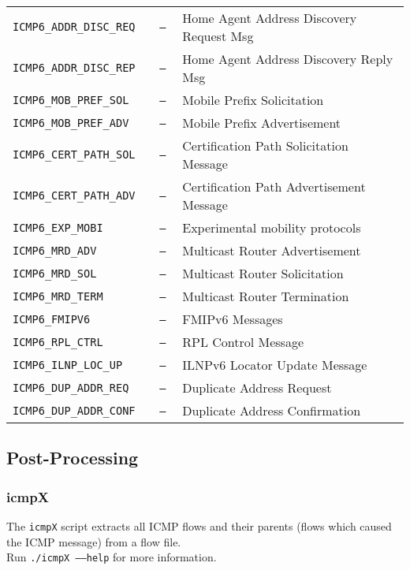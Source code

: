 \documentclass[documentation]{subfiles}
\begin{document}
\begin{longtable}{>{\tt}l>{\tt}ll}
    ICMP6\_ADDR\_DISC\_REQ   & ---                                 & Home Agent Address Discovery Request Msg\\
    ICMP6\_ADDR\_DISC\_REP   & ---                                 & Home Agent Address Discovery Reply Msg\\
    ICMP6\_MOB\_PREF\_SOL    & ---                                 & Mobile Prefix Solicitation\\
    ICMP6\_MOB\_PREF\_ADV    & ---                                 & Mobile Prefix Advertisement\\
    ICMP6\_CERT\_PATH\_SOL   & ---                                 & Certification Path Solicitation Message\\
    ICMP6\_CERT\_PATH\_ADV   & ---                                 & Certification Path Advertisement Message\\
    ICMP6\_EXP\_MOBI         & ---                                 & Experimental mobility protocols\\
    ICMP6\_MRD\_ADV          & ---                                 & Multicast Router Advertisement\\
    ICMP6\_MRD\_SOL          & ---                                 & Multicast Router Solicitation\\
    ICMP6\_MRD\_TERM         & ---                                 & Multicast Router Termination\\
    ICMP6\_FMIPV6            & ---                                 & FMIPv6 Messages\\
    ICMP6\_RPL\_CTRL         & ---                                 & RPL Control Message\\
    ICMP6\_ILNP\_LOC\_UP     & ---                                 & ILNPv6 Locator Update Message\\
    ICMP6\_DUP\_ADDR\_REQ    & ---                                 & Duplicate Address Request\\
    ICMP6\_DUP\_ADDR\_CONF   & ---                                 & Duplicate Address Confirmation\\
    \bottomrule
\end{longtable}

\subsection{Post-Processing}

\subsubsection{icmpX}
The {\tt icmpX} script extracts all ICMP flows and their parents (flows which caused the ICMP message) from a flow file.\\
Run {\tt ./icmpX --{}--help} for more information.
\end{document}
